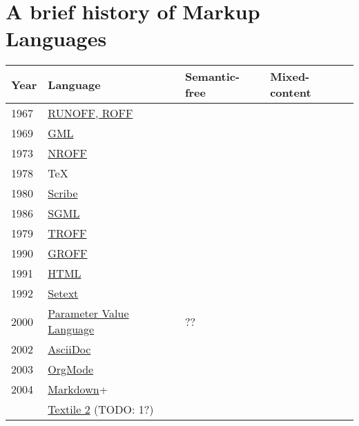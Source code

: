 \documentclass{scrreprt}
\begin{document}
\section{A brief history of Markup Languages}

\begin{tabular}{ l | l | l | l }
  \textbf{Year} &
  \textbf{Language} &
  \textbf{Semantic-free} &
  \textbf{Mixed-content}
  \\ \hline

  1967 &
  \href{http://en.wikipedia.org/wiki/RUNOFF}{RUNOFF, ROFF}

  \\ \hline
  1969 &
  \href{http://en.wikipedia.org/wiki/IBM_Generalized_Markup_Language}{GML}

  \\ \hline
  1973 &
  \href{http://en.wikipedia.org/wiki/Nroff}{NROFF}

  \\ \hline
  1978 &
  TeX

  \\ \hline
  1980 &
  \href{http://www.dtic.mil/docs/citations/ADA125287}{Scribe}

  \\ \hline
  1986 &
  \href{http://en.wikipedia.org/wiki/SGML}{SGML}

  \\ \hline
  1979 &
  \href{http://www.troff.org/history.html}{TROFF}

  \\ \hline
  1990 &
  \href{http://en.wikipedia.org/wiki/Groff_(software)}{GROFF}

  \\ \hline
  1991 &
  \href{http://alistapart.com/article/a-brief-history-of-markup}{HTML}

  \\ \hline
  1992 &
  \href{http://en.wikipedia.org/wiki/Setext}{Setext}


  \\ \hline
  2000
  & \href{http://public.ccsds.org/publications/archive/641x0b2.pdf}{Parameter Value Language}
  & ??

  \\ \hline
  2002 &
  \href{http://en.wikipedia.org/wiki/Asciidoc}{AsciiDoc}

  \\ \hline
  2003 &
  \href{http://en.wikipedia.org/wiki/Org-mode}{OrgMode}

  \\ \hline
  2004 &
  \href{http://en.wikipedia.org/wiki/Markdown}{Markdown}+


  \\ \hline
  &
  \href{http://en.wikipedia.org/wiki/Textile_(markup_language)}{Textile 2} (TODO: 1?)
\end{tabular}
\end{document}
